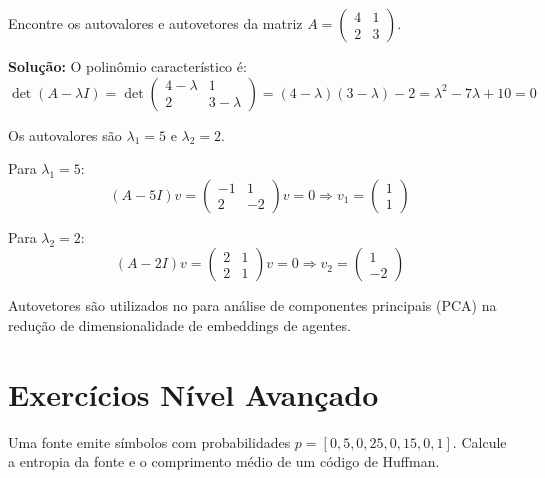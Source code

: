 \begin{exercicio}\label{exer:resol-autoval}
Encontre os autovalores e autovetores da matriz \(A =
\begin{pmatrix} 4 & 1 \\ 2 & 3 \end{pmatrix}\).
\end{exercicio}

\textbf{Solução:} O polinômio característico é:
\[
\det(A - \lambda I) = \det\begin{pmatrix} 4-\lambda & 1 \\ 2 & 3-\lambda \end{pmatrix}
= (4-\lambda)(3-\lambda) - 2 = \lambda^2 - 7\lambda + 10 = 0
\]

Os autovalores são \(\lambda_1 = 5\) e \(\lambda_2 = 2\).

Para \(\lambda_1 = 5\):
\[
(A - 5I)v = \begin{pmatrix} -1 & 1 \\ 2 & -2 \end{pmatrix}v = 0
\Rightarrow v_1 = \begin{pmatrix} 1 \\ 1 \end{pmatrix}
\]

Para \(\lambda_2 = 2\):
\[
(A - 2I)v = \begin{pmatrix} 2 & 1 \\ 2 & 1 \end{pmatrix}v = 0
\Rightarrow v_2 = \begin{pmatrix} 1 \\ -2 \end{pmatrix}
\]

Autovetores são utilizados no \opencodeeco{} para análise de componentes
principais (PCA) na redução de dimensionalidade de embeddings de agentes.

\section{Exercícios Nível Avançado}
\label{sec:exer-nivel-avancado}
\nivelavancado

\begin{exercicio}\label{exer:resol-entropia}
Uma fonte emite símbolos com probabilidades \(p = [0{,}5, 0{,}25, 0{,}15,
0{,}1]\). Calcule a entropia da fonte e o comprimento médio de um código
de Huffman.
\end{exercicio}

